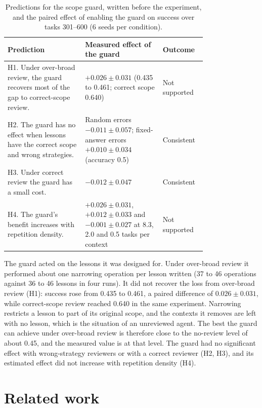 \documentclass{article}
\begin{document}
\begin{table}[t]
\centering
\caption{Predictions for the scope guard, written before the experiment, and the paired
effect of enabling the guard on success over tasks 301--600 (6 seeds per condition).}
\label{tab:guard}
\small
\begin{tabular}{p{0.39\linewidth}p{0.39\linewidth}l}
\toprule
Prediction & Measured effect of the guard & Outcome \\
\midrule
H1. Under over-broad review, the guard recovers most of the gap to correct-scope review.
  & $+0.026 \pm 0.031$ (0.435 to 0.461; correct scope 0.640)
  & Not supported \\
\addlinespace
H2. The guard has no effect when lessons have the correct scope and wrong strategies.
  & Random errors $-0.011 \pm 0.057$; fixed-answer errors $+0.010 \pm 0.034$ (accuracy
    0.5)
  & Consistent \\
\addlinespace
H3. Under correct review the guard has a small cost.
  & $-0.012 \pm 0.047$
  & Consistent \\
\addlinespace
H4. The guard's benefit increases with repetition density.
  & $+0.026 \pm 0.031$, $+0.012 \pm 0.033$ and $-0.001 \pm 0.027$ at 8.3, 2.0 and 0.5
    tasks per context
  & Not supported \\
\bottomrule
\end{tabular}
\end{table}

The guard acted on the lessons it was designed for. Under over-broad review it performed
about one narrowing operation per lesson written (37 to 46 operations against 36 to 46
lessons in four runs). It did not recover the loss from over-broad review (H1): success
rose from 0.435 to 0.461, a paired difference of $0.026 \pm 0.031$, while correct-scope
review reached 0.640 in the same experiment. Narrowing restricts a lesson to part of its
original scope, and the contexts it removes are left with no lesson, which is the
situation of an unreviewed agent. The best the guard can achieve under over-broad review
is therefore close to the no-review level of about 0.45, and the measured value is at that
level. The guard had no significant effect with wrong-strategy reviewers or with a
correct reviewer (H2, H3), and its estimated effect did not increase with repetition
density (H4).

\section{Related work}
\end{document}
